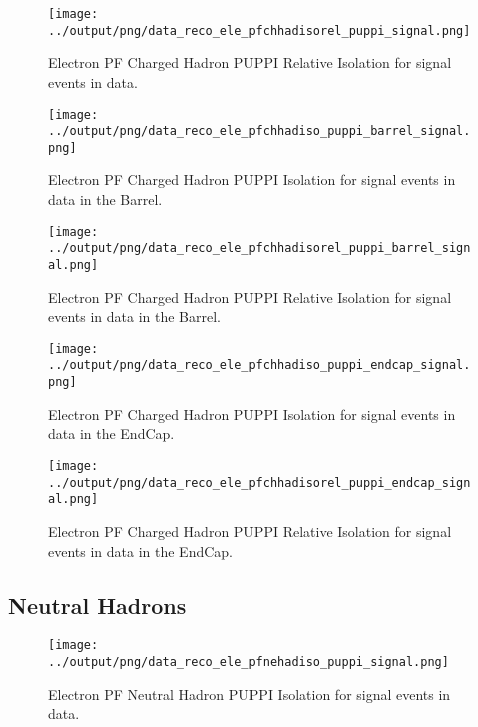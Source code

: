\documentclass[11pt]{book}
\begin{document}
\begin{figure}[htb]
\centering
\texttt{[image: ../output/png/data\_reco\_ele\_pfchhadisorel\_puppi\_signal.png]}
\caption{Electron PF Charged Hadron PUPPI Relative Isolation for signal events in data.}
\label{fig:data_ele_pfchhadisorel_puppi_signal}
\end{figure}

\begin{figure}[htb]
\centering
\texttt{[image: ../output/png/data\_reco\_ele\_pfchhadiso\_puppi\_barrel\_signal.png]}
\caption{Electron PF Charged Hadron PUPPI Isolation for signal events in data in the Barrel.}
\label{fig:data_ele_pfchhadiso_puppi_barrel_signal}
\end{figure}

\begin{figure}[htb]
\centering
\texttt{[image: ../output/png/data\_reco\_ele\_pfchhadisorel\_puppi\_barrel\_signal.png]}
\caption{Electron PF Charged Hadron PUPPI Relative Isolation for signal events in data in the Barrel.}
\label{fig:data_ele_pfchhadisorel_puppi_barrel_signal}
\end{figure}

\begin{figure}[htb]
\centering
\texttt{[image: ../output/png/data\_reco\_ele\_pfchhadiso\_puppi\_endcap\_signal.png]}
\caption{Electron PF Charged Hadron PUPPI Isolation for signal events in data in the EndCap.}
\label{fig:data_ele_pfchhadiso_puppi_endcap_signal}
\end{figure}

\begin{figure}[htb]
\centering
\texttt{[image: ../output/png/data\_reco\_ele\_pfchhadisorel\_puppi\_endcap\_signal.png]}
\caption{Electron PF Charged Hadron PUPPI Relative Isolation for signal events in data in the EndCap.}
\label{fig:data_ele_pfchhadisorel_puppi_endcap_signal}
\end{figure}
\clearpage

\subsection{Neutral Hadrons}
\begin{figure}[htb]
\centering
\texttt{[image: ../output/png/data\_reco\_ele\_pfnehadiso\_puppi\_signal.png]}
\caption{Electron PF Neutral Hadron PUPPI Isolation for signal events in data.}
\label{fig:data_ele_pfnehadiso_puppi_signal}
\end{figure}
\end{document}
